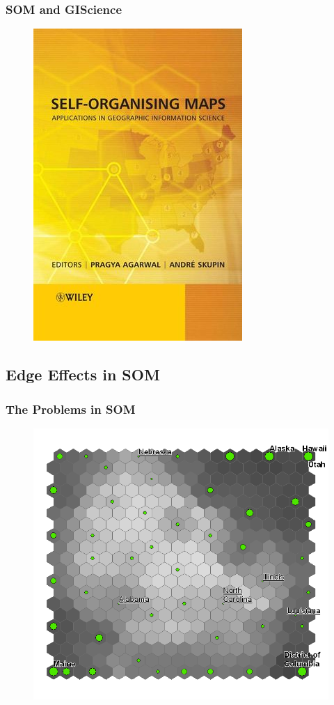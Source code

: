 \documentclass[nototal,handout]{beamer}
\begin{document}
\begin{frame}
	\frametitle{SOM and GIScience}
  \begin{center}
  \begin{figure}
  \includegraphics[width=0.50\linewidth]{book.png}
  \end{figure}
  \end{center}
 \end{frame} 

\subsection{Edge Effects in SOM} 

\begin{frame}
	\frametitle{The Problems in SOM}
  \begin{center}
  \begin{figure}
  \includegraphics[width=0.60\linewidth]{states.png}
  \end{figure}
  \end{center}
 \end{frame} 
\end{document}
